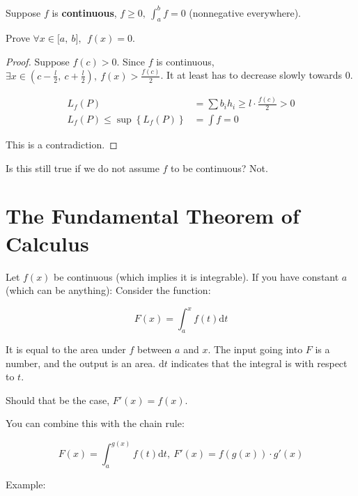 \documentclass[12pt]{article}
\theoremstyle{plain}
\theoremstyle{remark}
\theoremstyle{definition}
\begin{document}
Suppose \(f\) is \textbf{continuous}, \(f \geq 0,\ \int_{a}^{b}f = 0\)
(nonnegative everywhere).

Prove \(\forall x \in \lbrack a,\ b\rbrack,\ \ f(x) = 0\).

\begin{proof} Suppose \(f(c) > 0\). Since \(f\) is continuous,
\(\exists x \in \left( c - \frac{l}{2},\ c + \frac{l}{2} \right),\ f(x) > \frac{f(c)}{2}\).
It at least has to decrease slowly towards 0.

\begin{align*}
L_{f}(P) &= \sum b_{i}h_{i} \geq l \cdot \frac{f(c)}{2} > 0 \\
L_{f}(P) \leq \sup\left\{ L_{f}(P) \right\} &= \int f = 0
\end{align*}


This is a contradiction. 
\end{proof}

Is this still true if we do not assume \(f\) to be continuous? Not.


\section{The Fundamental Theorem of
Calculus}

Let \(f(x)\) be continuous (which implies it is integrable). If you have
constant \(a\) (which can be anything): Consider the function:

\[F(x) = \int_{a}^{x}{f(t)\text{d}t}\]

It is equal to the area under \(f\) between \(a\) and \(x\). The input
going into \(F\) is a number, and the output is an area. \(\text{d}t\)
indicates that the integral is with respect to \(t\).

Should that be the case, \(F'(x) = f(x)\).

You can combine this with the chain rule:

\[F(x) = \int_{a}^{g(x)}{f(t)\text{d}t},\ F'(x) = f\left( g(x) \right) \cdot g'(x)\]

Example:
\end{document}
